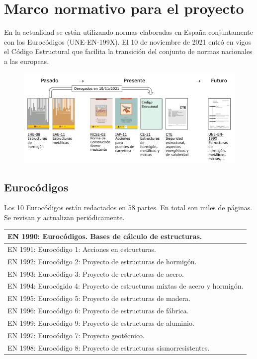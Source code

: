 \section{Marco normativo para el proyecto}  
En la actualidad se están utilizando normas elaboradas en España conjuntamente con los Eurocódigos (UNE-EN-199X). El 10 de noviembre de 2021 entró en vigos el Código Estructural que facilita la transición del conjunto de normas nacionales a las europeas.

\begin{figure}[H]
    \centering
    \includegraphics[width = 0.5 \textwidth]{Imagenes/Marco normativo para el proyecto.png}
\end{figure}

\subsection{Eurocódigos}
Los 10 Eurocódigos están redactados en 58 partes. En total son miles de páginas. Se revisan y actualizan periódicamente.

\begin{table}[H]
    \centering
    \begin{tabular}{| p{8cm} |}
        \hline
        EN 1990: Eurocódigos. Bases de cálculo de estructuras. \\
        \hline
        EN 1991: Eurocódigo 1: Acciones en estructuras. \\
        \hline
        EN 1992: Eurocódigo 2: Proyecto de estructuras de hormigón. \\
        EN 1993: Eurocódigo 3: Proyecto de estructuras de acero. \\
        EN 1994: Eurocógido 4: Proyecto de estructuras mixtas de acero y hormigón. \\
        EN 1995: Eurocódigo 5: Proyecto de estructuras de madera. \\
        EN 1996: Eurocódigo 6: Proyecto de estructuras de fábrica. \\
        EN 1999: Eurocódigo 9: Proyecto de estructuras de aluminio. \\
        \hline
        EN 1997: Eurocódigo 7: Proyecto geotécnico. \\
        EN 1998: Eurocódigo 8: Proyecto de estructuras sismorresistentes. \\
        \hline
    \end{tabular}
\end{table}

